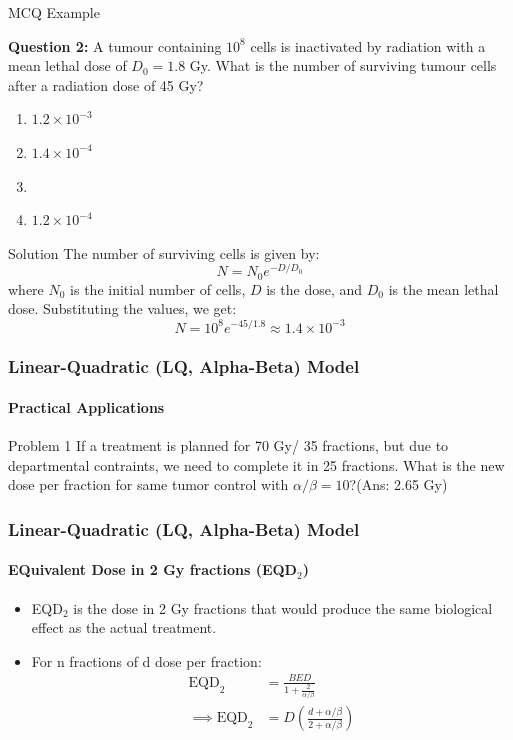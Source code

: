 \documentclass{beamer}
\begin{document}
\begin{frame}{MCQ Example}

\textbf{Question 2:} A tumour containing $10^8$ cells is inactivated by radiation with a mean lethal dose of $D_0 = 1.8$ Gy. What is the number of surviving tumour cells after a radiation dose of 45 Gy?

\begin{enumerate}
    \item $1.2 \times 10^{-3}$
    \item $1.4 \times 10^{-4}$
    \item {}
    \item $1.2 \times 10^{-4}$
\end{enumerate}
\begin{block}{Solution}
    The number of surviving cells is given by:
    $$N = N_0 e^{-D/D_0}$$
    where $N_0$ is the initial number of cells, $D$ is the dose, and $D_0$ is the mean lethal dose.
    Substituting the values, we get:
    $$N = 10^8 e^{-45/1.8} \approx 1.4 \times 10^{-3}$$

\end{block}
\end{frame}

\begin{frame}
  \frametitle{Linear-Quadratic (LQ, Alpha-Beta) Model}
  \framesubtitle{Practical Applications}
  \begin{alertblock}{Problem 1}
    If a treatment is planned for 70 Gy/ 35 fractions, but due to departmental contraints, we need to complete it in 25 fractions. What is the new dose per fraction for same tumor control with $\alpha/\beta = 10$?(Ans: 2.65 Gy)
  \end{alertblock}

\end{frame}

\begin{frame}
  \frametitle{Linear-Quadratic (LQ, Alpha-Beta) Model}
  \framesubtitle{EQuivalent Dose in 2 Gy fractions (EQD$_2$)}
  \begin{itemize}
    \item EQD$_2$ is the dose in 2 Gy fractions that would produce the same biological effect as the actual treatment.
    \item For n fractions of d dose per fraction:
    \begin{align*}
      \text{EQD}_2 &= \frac{BED}{1 + \frac{2}{\alpha/\beta}} \\
     \implies \text{EQD}_2 &= D\left(\frac{d + \alpha/ \beta}{2 + \alpha/ \beta}\right)
    \end{align*}
  \end{itemize}
\end{frame}
\end{document}
